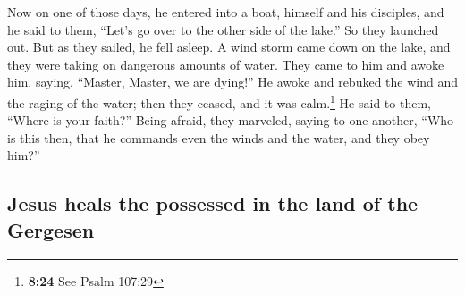  Now on one of those days, he entered into a boat,
himself and his disciples, and he said to them, ``Let's go over to the
other side of the lake.'' So they launched out.  But as
they sailed, he fell asleep. A wind storm came down on the lake, and
they were taking on dangerous amounts of water.  They
came to him and awoke him, saying, ``Master, Master, we are dying!'' He
awoke and rebuked the wind and the raging of the water; then they
ceased, and it was calm.\footnote{\textbf{8:24} See Psalm 107:29}
 He said to them, ``Where is your faith?'' Being afraid,
they marveled, saying to one another, ``Who is this then, that he
commands even the winds and the water, and they obey him?''

\hypertarget{jesus-heals-the-possessed-in-the-land-of-the-gergesen}{%
\subsection{Jesus heals the possessed in the land of the
Gergesen}\label{jesus-heals-the-possessed-in-the-land-of-the-gergesen}}

